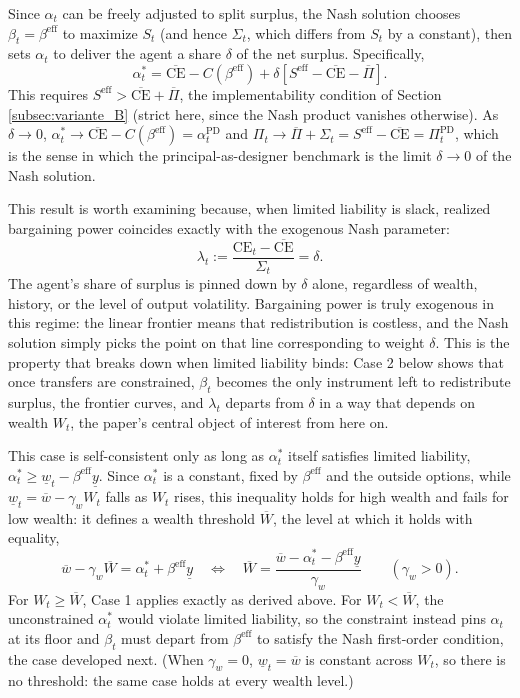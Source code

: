 \documentclass{article}
\theoremstyle{definition}
\theoremstyle{plain}
\begin{document}
Since $\alpha_t$ can be freely adjusted to split surplus, the Nash solution chooses $\beta_t = \beta^{\text{eff}}$ to maximize $S_t$ (and hence $\Sigma_t$, which differs from $S_t$ by a constant), then sets $\alpha_t$ to deliver the agent a share $\delta$ of the net surplus. Specifically,
\[
\alpha_t^* = \overline{\text{CE}} - C(\beta^{\text{eff}}) + \delta\left[S^{\text{eff}} - \overline{\text{CE}} - \overline{\Pi}\right].
\]
This requires $S^{\text{eff}} > \overline{\text{CE}} + \overline{\Pi}$, the implementability condition of Section \ref{subsec:variante_B} (strict here, since the Nash product vanishes otherwise). As $\delta \to 0$, $\alpha_t^* \to \overline{\text{CE}} - C(\beta^{\text{eff}}) = \alpha_t^{\text{PD}}$ and $\Pi_t \to \overline{\Pi} + \Sigma_t = S^{\text{eff}} - \overline{\text{CE}} = \Pi_t^{\text{PD}}$, which is the sense in which the principal-as-designer benchmark is the limit $\delta \to 0$ of the Nash solution.

This result is worth examining because, when limited liability is slack, realized bargaining power coincides exactly with the exogenous Nash parameter:
\[
\lambda_t := \frac{\text{CE}_t - \overline{\text{CE}}}{\Sigma_t} = \delta.
\]
The agent's share of surplus is pinned down by $\delta$ alone, regardless of wealth, history, or the level of output volatility. Bargaining power is truly exogenous in this regime: the linear frontier means that redistribution is costless, and the Nash solution simply picks the point on that line corresponding to weight $\delta$. This is the property that breaks down when limited liability binds: Case 2 below shows that once transfers are constrained, $\beta_t$ becomes the only instrument left to redistribute surplus, the frontier curves, and $\lambda_t$ departs from $\delta$ in a way that depends on wealth $W_t$, the paper's central object of interest from here on.

This case is self-consistent only as long as $\alpha_t^*$ itself satisfies limited liability, $\alpha_t^* \geq \underline{w}_t - \beta^{\text{eff}}\underline{y}$. Since $\alpha_t^*$ is a constant, fixed by $\beta^{\text{eff}}$ and the outside options, while $\underline{w}_t = \overline{w} - \gamma_w W_t$ falls as $W_t$ rises, this inequality holds for high wealth and fails for low wealth: it defines a wealth threshold $\overline{W}$, the level at which it holds with equality,
\[
\overline{w} - \gamma_w \overline{W} = \alpha_t^* + \beta^{\text{eff}}\underline{y} \quad \Longleftrightarrow \quad \overline{W} = \frac{\overline{w} - \alpha_t^* - \beta^{\text{eff}}\underline{y}}{\gamma_w} \qquad (\gamma_w > 0).
\]
For $W_t \geq \overline{W}$, Case 1 applies exactly as derived above. For $W_t < \overline{W}$, the unconstrained $\alpha_t^*$ would violate limited liability, so the constraint instead pins $\alpha_t$ at its floor and $\beta_t$ must depart from $\beta^{\text{eff}}$ to satisfy the Nash first-order condition, the case developed next. (When $\gamma_w = 0$, $\underline{w}_t = \overline{w}$ is constant across $W_t$, so there is no threshold: the same case holds at every wealth level.)
\end{document}

